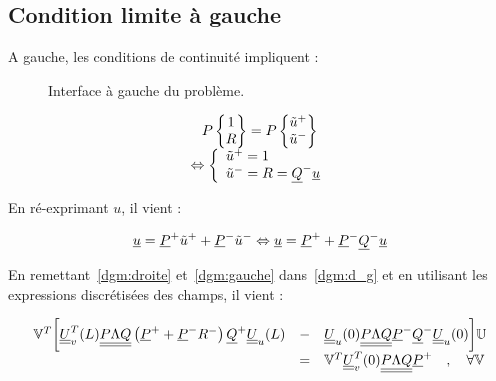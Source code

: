 \subsection{Condition limite à gauche}

A gauche, les conditions de continuité impliquent :

\begin{figure}[!ht]
	\centering
	
    \caption{\label{fig:interface}Interface à gauche du problème.}
\end{figure}

\begin{equation*}
    \begin{array}{c}
        P\begin{Bmatrix}1\\R\end{Bmatrix} = P\begin{Bmatrix}\tilde{u}^+\\\tilde{u}^-\end{Bmatrix}\\
            \Leftrightarrow \left\{\begin{array}{l}
                    \tilde{u}^+ = 1\\
                    \tilde{u}^- = R = \underline{Q}^-\underline{u}
            \end{array}\right.
    \end{array}
\end{equation*}

En ré-exprimant $u$, il vient :

\begin{equation}
    \underline{u} = \underline{P}^+\tilde{u}^+ + \underline{P}^-\tilde{u}^- \Leftrightarrow \underline{u} = \underline{P}^+ + \underline{P}^-\underline{Q}^-\underline{u}\label{dgm:gauche}
\end{equation}

En remettant~\eqref{dgm:droite} et~\eqref{dgm:gauche} dans~\eqref{dgm:d_g} et en utilisant les expressions discrétisées
des champs, il vient :

\begin{equation}
    \begin{array}{rcl}
        \mathbb{V}^T\bigg[\underline{\underline{U}}_v^T(L)\underline{\underline{P\Lambda Q}}\left(\underline{P}^+ + \underline{P}^-R^-\right)\underline{Q}^+\underline{\underline{U}}_u(L) & - &
    \underline{\underline{U}}_u(0)\underline{\underline{P\Lambda Q}}\underline{P}^-\underline{Q}^-\underline{\underline{U}}_u(0)\bigg] \mathbb{U}\\
    & = & \mathbb{V}^T\underline{\underline{U}}_v^T(0)\underline{\underline{P\Lambda Q}}\underline{P}^+ \quad,\quad \forall\mathbb{V}
    \end{array}
\end{equation}

